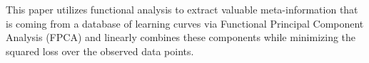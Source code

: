 This paper utilizes functional analysis to extract valuable meta-information that is coming from a database of learning curves via Functional Principal Component Analysis (FPCA) and linearly combines these components while minimizing the squared loss over the observed data points. 


%





